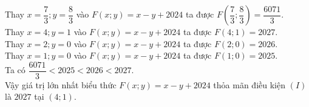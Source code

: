 \begin{bt}
{
		Thay  $x=;y=$ vào $F\left(x;y\right)=x-y+2024$ ta được $F\left(; \right)=$.\\
		Thay $x=4;y=1$ vào $F\left(x;y\right)=x-y+2024$  ta được $F\left(4;1\right)=2027$.\\
		Thay $x=2;y=0$  vào $F\left(x;y\right)=x-y+2024$ ta được $F\left(2;0\right)=2026$.\\
		Thay $x=1;y=0$ vào $F\left(x;y\right)=x-y+2024$  ta được $F\left(1;0\right)=2025$.\\
		Ta có $ < 2025< 2026< 2027$.\\ Vậy giá trị lớn nhất  biểu thức $F\left(x;y\right)=x-y+2024$ thỏa mãn điều kiện $\left(I\right)$ là $2027$ tại $\left(4;1\right)$.
	 }
\end{bt}

